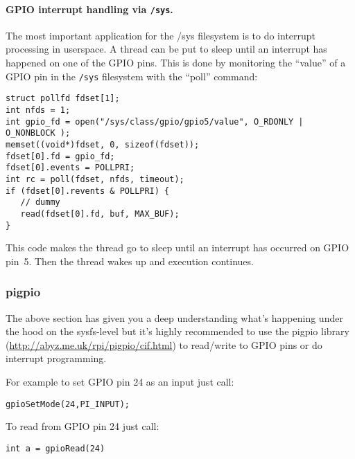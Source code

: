 \documentclass[12pt]{report}
\begin{document}
\paragraph{GPIO interrupt handling via \texttt{/sys}\label{gpioIRQ}.}
The most important application for the /sys filesystem is to
do interrupt processing in userspace.
A thread can be put to sleep until an interrupt has happened on one of
the GPIO pins. This is done by monitoring the ``value''
of a GPIO pin in the \texttt{/sys} filesystem with the ``poll'' command:
\begin{verbatim}
struct pollfd fdset[1];
int nfds = 1;
int gpio_fd = open("/sys/class/gpio/gpio5/value", O_RDONLY | O_NONBLOCK );
memset((void*)fdset, 0, sizeof(fdset));
fdset[0].fd = gpio_fd;
fdset[0].events = POLLPRI;
int rc = poll(fdset, nfds, timeout);
if (fdset[0].revents & POLLPRI) {
   // dummy
   read(fdset[0].fd, buf, MAX_BUF);
}
\end{verbatim}
This code makes the thread go to sleep until an interrupt has occurred on
GPIO pin~5. Then the thread wakes up and execution continues.

\subsubsection{pigpio}
The above section has given you a deep understanding what's happening
under the hood on the sysfs-level but it's highly recommended to
use the pigpio library (\url{http://abyz.me.uk/rpi/pigpio/cif.html})
to read/write to GPIO pins or do interrupt programming.

For example to set GPIO pin 24 as an input just call:
\begin{verbatim}
gpioSetMode(24,PI_INPUT);
\end{verbatim}

To read from GPIO pin 24 just call:
\begin{verbatim}
int a = gpioRead(24)
\end{verbatim}
\end{document}
